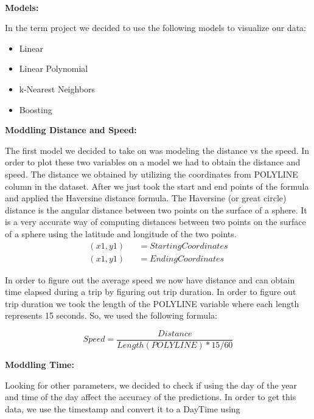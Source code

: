 \documentclass[11pt]{article}
\begin{document}
\\
\textbf{Models:}
\par
In the term project we decided to use the following models to visualize our data:
\begin{itemize}
	\item Linear
	\item Linear Polynomial
	\item k-Nearest Neighbors
	\item Boosting
\end{itemize}

\textbf{Moddling Distance and Speed:}
\par
The first model we decided to take on was modeling the distance vs the 
speed. In order to plot these two variables on a model we had to obtain 
the distance and speed. The distance we obtained by utilizing the 
coordinates from POLYLINE column in the dataset. After we just took the 
start and end points of the formula and applied the Haversine distance 
formula. The Haversine (or great circle) distance is the angular distance 
between two points on the surface of a sphere. It is a very accurate way 
of computing distances between two points on the surface of a sphere using 
the latitude and longitude of the two points.
\begin{equation*}
	\begin{aligned}
		(x1,y1) &&= Starting Coordinates\\
		(x1,y1) &&=Ending Coordinates
	\end{aligned}
\end{equation*}

\par
In order to figure out the average speed we now have distance and can obtain time elapsed during a trip by figuring out trip duration. In order to figure out trip duration we took the length of the POLYLINE variable where each length represents 15 seconds. So, we used the following formula:

\begin{equation*}
	Speed = \frac{Distance} {Length(POLYLINE) * 15 / 60}
\end{equation*}

\textbf{Moddling Time:}
\par
Looking for other parameters, we decided to check if using the day of the year and time of the day affect the accuracy of the predictions. In order to get this data, we use the timestamp and convert it to a DayTime using
\end{document}
